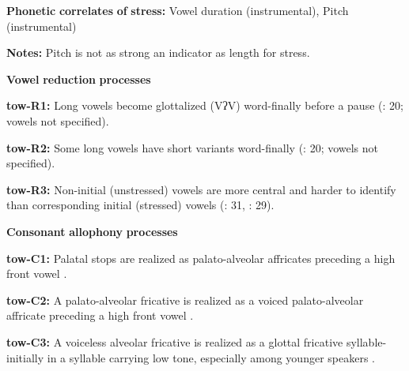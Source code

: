 \documentclass[output=paper]{langsci/langscibook}
\begin{document}
\begin{styleBody}
\textbf{Phonetic} \textbf{correlates} \textbf{of} \textbf{stress:} Vowel duration (instrumental), Pitch (instrumental)
\end{styleBody}

\begin{styleBody}
\textbf{Notes:} Pitch is not as strong an indicator as length for stress.
\end{styleBody}

\begin{styleBody}
\textbf{Vowel} \textbf{reduction} \textbf{processes}
\end{styleBody}

\begin{styleBody}
\textbf{tow-R1:} Long vowels become glottalized (VʔV) word-finally before a pause (\citealt{Yumitani1998}: 20; vowels not specified).
\end{styleBody}

\begin{styleBody}
\textbf{tow-R2:} Some long vowels have short variants word-finally (\citealt{Yumitani1998}: 20; vowels not specified).
\end{styleBody}

\begin{styleBody}
\textbf{tow-R3:} Non-initial (unstressed) vowels are more central and harder to identify than corresponding initial (stressed) vowels (\citealt{Yumitani1998}: 31, \citealt{Bell1993}: 29).
\end{styleBody}

\begin{styleBody}
\textbf{Consonant} \textbf{allophony} \textbf{processes}
\end{styleBody}

\begin{styleBody}
\textbf{tow-C1:} Palatal stops are realized as palato-alveolar affricates preceding a high front vowel \citep[13]{Yumitani1998}.
\end{styleBody}

\begin{styleBody}
\textbf{tow-C2:} A palato-alveolar fricative is realized as a voiced palato-alveolar affricate preceding a high front vowel \citep[13]{Yumitani1998}.
\end{styleBody}

\begin{styleBody}
\textbf{tow-C3:} A voiceless alveolar fricative is realized as a glottal fricative syllable-initially in a syllable carrying low tone, especially among younger speakers \citep[13]{Yumitani1998}.
\end{styleBody}
\end{document}
